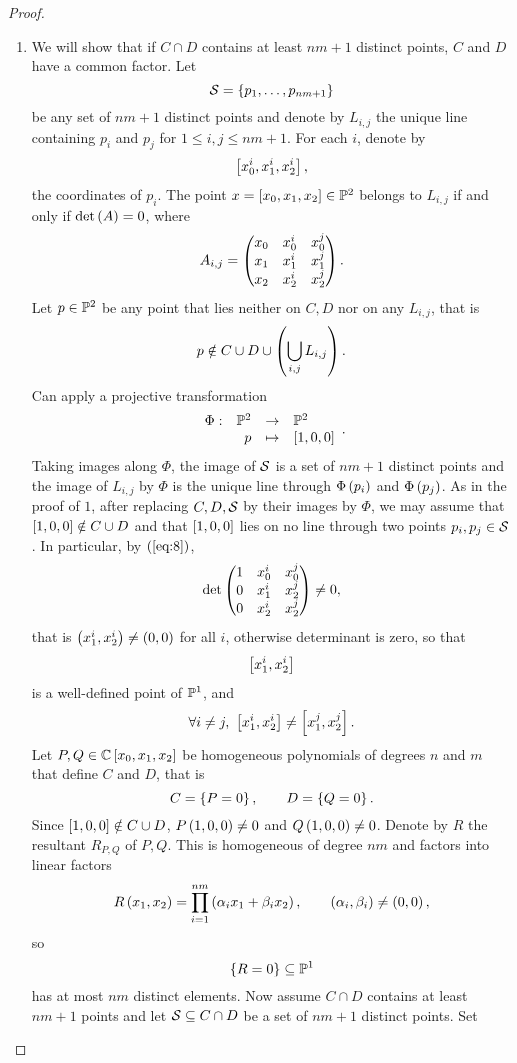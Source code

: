 \begin{proof}
\begin{enumerate}
\pagebreak


\item We will show that if $ C \cap D $ contains at least $ nm + 1 $ distinct points, $ C $ and $ D $ have a common factor. Let
$$ \SS = \cb{p_1, \dots, p_{nm + 1}} $$
be any set of $ nm + 1 $ distinct points and denote by $ L_{i, j} $ the unique line containing $ p_i $ and $ p_j $ for $ 1 \le i, j \le nm + 1 $. For each $ i $, denote by
$$ \sb{x_0^i, x_1^i, x_2^i}, $$
the coordinates of $ p_i $. The point $ x = \sb{x_0, x_1, x_2} \in \P^2 $ belongs to $ L_{i, j} $ if and only if $ \det\rb{A} = 0 $, where
\begin{equation}
\label{eq:8}
A_{i, j} = \threebythree{x_0}{x_0^i}{x_0^j}{x_1}{x_1^i}{x_1^j}{x_2}{x_2^i}{x_2^j}.
\end{equation}
Let $ p \in \P^2 $ be any point that lies neither on $ C, D $ nor on any $ L_{i, j} $, that is
$$ p \notin C \cup D \cup \rb{\bigcup_{i, j} L_{i, j}}. $$
Can apply a projective transformation
$$ \function[\Phi]{\P^2}{\P^2}{p}{\sb{1, 0, 0}}. $$
Taking images along $ \Phi $, the image of $ \SS $ is a set of $ nm + 1 $ distinct points and the image of $ L_{i, j} $ by $ \Phi $ is the unique line through $ \Phi\rb{p_i} $ and $ \Phi\rb{p_j} $. As in the proof of $ 1 $, after replacing $ C, D, \SS $ by their images by $ \Phi $, we may assume that $ \sb{1, 0, 0} \notin C \cup D $ and that $ \sb{1, 0, 0} $ lies on no line through two points $ p_i, p_j \in \SS $. In particular, by $ \rb{\ref{eq:8}} $,
$$ \det\threebythree{1}{x_0^i}{x_0^j}{0}{x_1^i}{x_2^j}{0}{x_2^i}{x_2^j} \ne 0, $$
that is $ \rb{x_1^i, x_2^i} \ne \rb{0, 0} $ for all $ i $, otherwise determinant is zero, so that
$$ \sb{x_1^i, x_2^i} $$
is a well-defined point of $ \P^1 $, and
$$ \forall i \ne j, \ \sb{x_1^i, x_2^i} \ne \sb{x_1^j, x_2^j}. $$
Let $ P, Q \in \C\sb{x_0, x_1, x_2} $ be homogeneous polynomials of degrees $ n $ and $ m $ that define $ C $ and $ D $, that is
$$ C = \cb{P = 0}, \qquad D = \cb{Q = 0}. $$
Since $ \sb{1, 0, 0} \notin C \cup D $, $ P\rb{1, 0, 0} \ne 0 $ and $ Q\rb{1, 0 , 0} \ne 0 $. Denote by $ R $ the resultant $ R_{P, Q} $ of $ P, Q $. This is homogeneous of degree $ nm $ and factors into linear factors
$$ R\rb{x_1, x_2} = \prod_{i = 1}^{nm}\rb{\alpha_ix_1 + \beta_ix_2}, \qquad \rb{\alpha_i, \beta_i} \ne \rb{0, 0}, $$
so
$$ \cb{R = 0} \subseteq \P^1 $$
has at most $ nm $ distinct elements. Now assume $ C \cap D $ contains at least $ nm + 1 $ points and let $ \SS \subseteq C \cap D $ be a set of $ nm + 1 $ distinct points. Set

\end{enumerate}
\end{proof}
